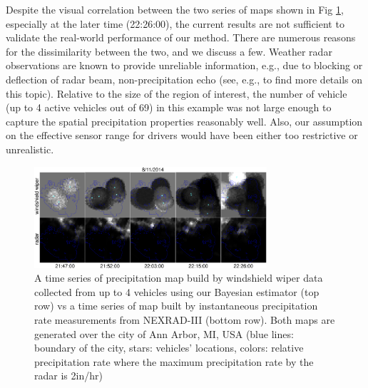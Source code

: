 \documentclass[journal]{IEEEtran}
\begin{document}
Despite the visual correlation between the two series of maps shown in Fig \ref{fig:fig8}, especially at the later time (22:26:00), the current results are not sufficient to validate the real-world performance of our method. 
There are numerous reasons for the dissimilarity between the two, and we discuss a few. Weather radar observations are known to provide unreliable information, e.g., due to blocking or deflection of radar beam, non-precipitation echo (see, e.g., \cite{berg2016creation} to find more details on this topic).
Relative to the size of the region of interest, the number of vehicle (up to 4 active vehicles out of 69) in this example was not large enough to capture the spatial precipitation properties reasonably well.
Also, our assumption on the effective sensor range for drivers would have been either too restrictive or unrealistic.


\begin{figure}
	\centering
	\includegraphics[width=3.4in]{figure/wind_wiper_data}
	\caption{A time series of precipitation map build by windshield wiper data collected from up to 4 vehicles using our Bayesian estimator (top row) vs a time series of map built by instantaneous precipitation rate measurements from NEXRAD-III (bottom row). Both maps are generated over the city of Ann Arbor, MI, USA (blue lines: boundary of the city, stars: vehicles' locations, colors: relative precipitation rate where the maximum precipitation rate by the radar is 2in/hr)}
	\label{fig:fig8}
\end{figure}
\end{document}
